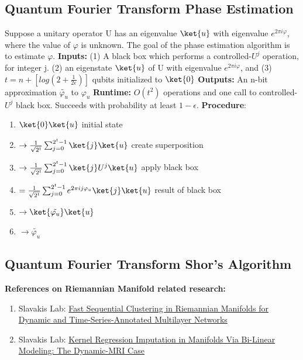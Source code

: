 \subsection*{Quantum Fourier Transform Phase Estimation}
Suppose a unitary operator U has an eigenvalue $\ket{u}$ with 
eigenvalue $e^{2 \pi i \varphi}$, where the value of 
$\varphi$ is unknown. The goal of the 
phase estimation algorithm is to estimate $\varphi$.
\newline
\textbf{Inputs:} (1) A black box which performs a 
controlled-$U^j$ operation, for integer j. (2) an 
eigenstate $\ket{u}$ of U with eigenvalue $e^{2 \pi i \varphi}$, and 
(3) $t = n + [log(2+\frac{1}{2 \epsilon})]$ qubits initialized 
to $\ket{0}$ \newline
\textbf{Outputs:} An n-bit approximation $\tilde{\varphi_u}$ to $\varphi_u$ \newline
\textbf{Runtime:} $O(t^2)$ operations and one call to controlled-$U^j$
black box. Succeeds with probability at least $1-\epsilon$. \newline
\textbf{Procedure}: 
\begin{enumerate}
  \item $\ket{0}\ket{u}$  initial state
  \item $\rightarrow \frac{1}{\sqrt{2^t}} \sum^{2^t -1}_{j=0} \ket{j}\ket{u} $ create superposition
  \item $\rightarrow \frac{1}{\sqrt{2^t}} \sum^{2^t -1}_{j=0} \ket{j} U^j \ket{u} $ apply black box
  \item $= \frac{1}{\sqrt{2^t}} \sum^{2^t -1}_{j=0}  e^{2 \pi i j \varphi_u} \ket{j} \ket{u} $ result of black box 
  \item $\rightarrow \ket{\tilde{\varphi_u}} \ket{u}$
  \item  $\rightarrow \tilde{\varphi_u}$
\end{enumerate}

\subsection*{Quantum Fourier Transform Shor's Algorithm}


\textbf{References on Riemannian Manifold related research:}
\begin{enumerate}
  \item Slavakis Lab: \href{https://ieeexplore.ieee.org/document/9321498}{Fast Sequential Clustering in Riemannian Manifolds 
  for Dynamic and Time-Series-Annotated Multilayer Networks}
  \item Slavakis Lab: \href{https://ieeexplore.ieee.org/document/9699419}{Kernel Regression Imputation in Manifolds Via Bi-Linear Modeling: 
  The Dynamic-MRI Case}
\end{enumerate}

